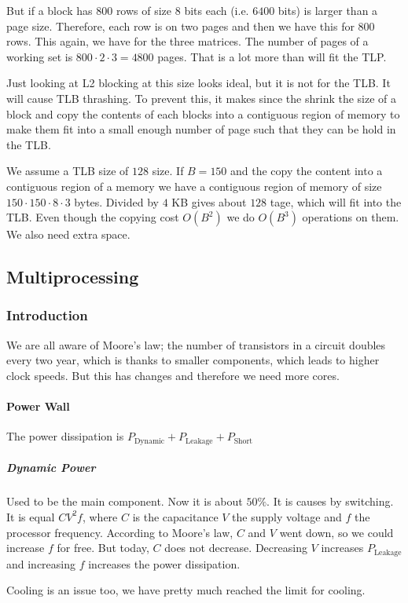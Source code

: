 But if a block has $800$ rows of size $8$ bits each (i.e. $6400$ bits) is larger than a page size. Therefore, each row is on two pages and then we have this for $800$ rows. This again, we have for the three matrices. The number of pages of a working set is $800 \cdot 2 \cdot 3 = 4800$ pages. That is a lot more than will fit the TLP. 

Just looking at L2 blocking at this size looks ideal, but it is not for the TLB. It will cause TLB thrashing. To prevent this, it makes since the shrink the size of a block and copy the contents of each blocks into a contiguous region of memory to make them fit into a small enough number of page such that they can be hold in the TLB.

We assume a TLB size of $128$ size. If $B = 150$ and the copy the content into a contiguous region of a memory we have a contiguous region of memory of size $150 \cdot 150 \cdot 8 \cdot 3$ bytes. Divided by $4$ KB gives about $128$ tage, which will fit into the TLB. Even though the copying cost $O(B^2)$ we do $O(B^3)$ operations on them. We also need extra space.

\subsection*{Multiprocessing}
\subsubsection{Introduction}
We are all aware of Moore's law; the number of transistors in a circuit doubles every two year, which is thanks to smaller components, which leads to higher clock speeds. But this has changes and therefore we need more cores.

\paragraph{Power Wall}
The power dissipation is $P_{\text{Dynamic}} + P_{\text{Leakage}} + P_{\text{Short}}$

\subparagraph{Dynamic Power}
Used to be the main component. Now it is about $50\%$. It is causes by switching. It is equal $CV^2f$, where $C$ is the capacitance $V$ the supply voltage and $f$ the processor frequency. According to Moore's law, $C$ and $V$ went down, so we could increase $f$ for free. But today, $C$ does not decrease. Decreasing $V$ increases $P_{\text{Leakage}}$ and increasing $f$ increases the power dissipation.

Cooling is an issue too, we have pretty much reached the limit for cooling.

